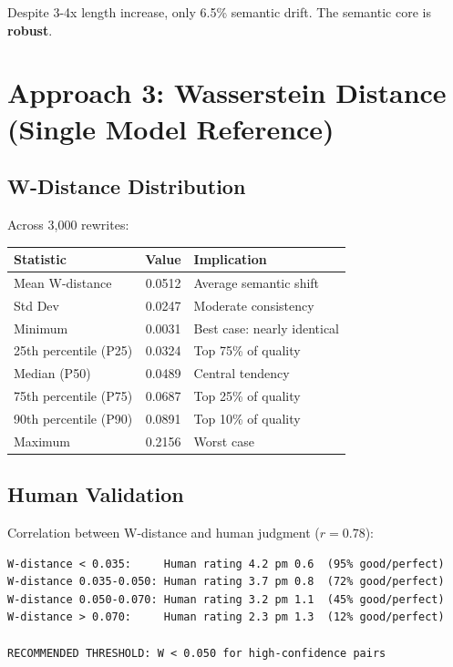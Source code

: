 \documentclass[12pt,a4paper,oneside]{report}
\begin{document}
Despite 3-4x length increase, only 6.5\% semantic drift. The semantic core is \textbf{robust}.

\section{Approach 3: Wasserstein Distance (Single Model Reference)}

\subsection{W-Distance Distribution}

Across 3,000 rewrites:

\begin{table}[H]
\centering
\begin{tabular}{|l|r|p{5cm}|}
\hline
\textbf{Statistic} & \textbf{Value} & \textbf{Implication} \\
\hline
Mean W-distance & 0.0512 & Average semantic shift \\
\hline
Std Dev & 0.0247 & Moderate consistency \\
\hline
Minimum & 0.0031 & Best case: nearly identical \\
\hline
25th percentile (P25) & 0.0324 & Top 75\% of quality \\
\hline
Median (P50) & 0.0489 & Central tendency \\
\hline
75th percentile (P75) & 0.0687 & Top 25\% of quality \\
\hline
90th percentile (P90) & 0.0891 & Top 10\% of quality \\
\hline
Maximum & 0.2156 & Worst case \\
\hline
\end{tabular}
\end{table}

\subsection{Human Validation}

Correlation between W-distance and human judgment ($r = 0.78$):

\begin{lstlisting}[caption=W-Distance Human Alignment]
W-distance < 0.035:     Human rating 4.2 pm 0.6  (95% good/perfect)
W-distance 0.035-0.050: Human rating 3.7 pm 0.8  (72% good/perfect)
W-distance 0.050-0.070: Human rating 3.2 pm 1.1  (45% good/perfect)
W-distance > 0.070:     Human rating 2.3 pm 1.3  (12% good/perfect)

RECOMMENDED THRESHOLD: W < 0.050 for high-confidence pairs
\end{lstlisting}
\end{document}
